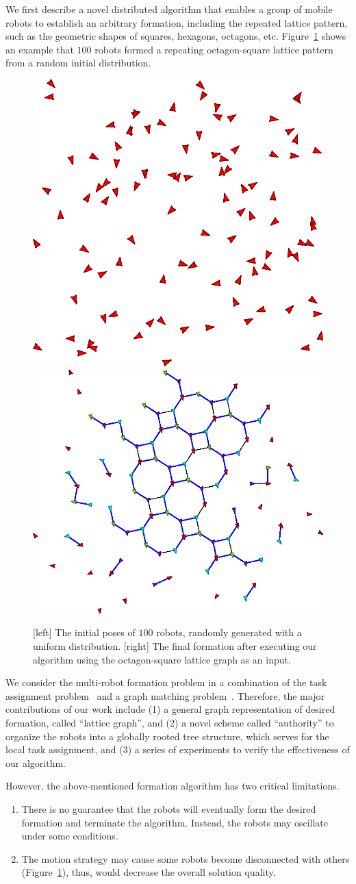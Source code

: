 We first describe a novel distributed algorithm that enables a group of mobile
robots to establish an arbitrary formation, including the repeated lattice
pattern, such as the geometric shapes of squares, hexagons, octagons, etc.
Figure~\ref{fig:octsq-init-final} shows an example that $100$ robots formed 
a repeating octagon-square lattice pattern from a random initial distribution.
\begin{figure}
  \centering
  \includegraphics[width=.4\columnwidth]{figs/initial-formation}
  \bigskip
  \includegraphics[width=.45\columnwidth]{figs/final-formation}
  \caption{[left] The initial poses of $100$ robots, randomly generated with a
  uniform distribution. [right] The final formation after executing our
  algorithm using the octagon-square lattice graph as an input.}
  \label{fig:octsq-init-final}
\end{figure}
We consider the multi-robot formation problem in a combination of the task
assignment problem~\cite{Kuh55, Mun57} and a graph matching
problem~\cite{Lov86}. Therefore, the major contributions of our work include (1)
a general graph representation of desired formation, called ``lattice graph'',
and (2) a novel scheme called ``authority'' to organize the robots into a
globally rooted tree structure, which serves for the local task assignment, 
and (3) a series of experiments to verify the effectiveness of our algorithm.

However, the above-mentioned formation algorithm has two critical limitations.
\begin{enumerate}
\item There is no guarantee that the robots will eventually form the
  desired formation and terminate the algorithm. 
  Instead, the robots may oscillate under some conditions.
\item The motion strategy may cause some robots become
  disconnected with others (Figure~\ref{fig:octsq-init-final}), 
  thus, would decrease the overall solution quality.
\end{enumerate}

